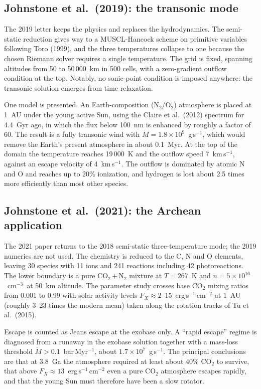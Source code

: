 \documentclass{my_memo}
\newcommand{\Mdot}{\dot{M}}
\newcommand{\ergs}{erg\,s$^{-1}$}
\newcommand{\gs}{g\,s$^{-1}$}
\newcommand{\cmc}{cm$^{-3}$}
\begin{document}
\subsection{Johnstone et al.\ (2019): the transonic mode}

The 2019 letter keeps the physics and replaces the hydrodynamics. The semi-static reduction gives
way to a MUSCL-Hancock scheme on primitive variables following Toro (1999), and the three
temperatures collapse to one because the chosen Riemann solver requires a single temperature. The
grid is fixed, spanning altitudes from 50 to 50\,000~km in 500 cells, with a zero-gradient
outflow condition at the top. Notably, no sonic-point condition is imposed anywhere: the
transonic solution emerges from time relaxation.

One model is presented. An Earth-composition (N$_2$/O$_2$) atmosphere is placed at 1~AU under the
young active Sun, using the Claire et al.\ (2012) spectrum for 4.4~Gyr ago, in which the flux
below 100~nm is enhanced by roughly a factor of 60. The result is a fully transonic wind with
$\Mdot = 1.8\times10^{9}$~\gs, which would remove the Earth's present atmosphere in about
0.1~Myr. At the top of the domain the temperature reaches 19\,000~K and the outflow speed 7~km\,s$^{-1}$,
against an escape velocity of 4~km\,s$^{-1}$. The outflow is dominated by atomic N and O and reaches
up to 20\% ionization, and hydrogen is lost about 2.5 times more efficiently than most other
species.

\subsection{Johnstone et al.\ (2021): the Archean application}

The 2021 paper returns to the 2018 semi-static three-temperature mode; the 2019 numerics are not
used. The chemistry is reduced to the C, N and O elements, leaving 30 species with 11 ions and
241 reactions including 42 photoreactions. The lower boundary is a pure CO$_2$\,$+$\,N$_2$
mixture at $T = 267$~K and $n = 5\times10^{16}$~\cmc\ at 50~km altitude. The parameter study
crosses base CO$_2$ mixing ratios from 0.001 to 0.99 with solar activity levels
$F_X \approx 2$--15~\ergs\,cm$^{-2}$ at 1~AU (roughly 3--23 times the modern mean) taken along the
rotation tracks of Tu et al.\ (2015).

Escape is counted as Jeans escape at the exobase only. A ``rapid escape'' regime is diagnosed from
a runaway in the exobase solution together with a mass-loss threshold
$\Mdot > 0.1$~bar\,Myr$^{-1}$, about $1.7\times10^{7}$~\gs. The principal conclusions are that at
3.8~Ga the atmosphere required at least about 40\% CO$_2$ to survive, that above
$F_X \approx 13$~\ergs\,cm$^{-2}$ even a pure CO$_2$ atmosphere escapes rapidly, and that the
young Sun must therefore have been a slow rotator.
\end{document}
